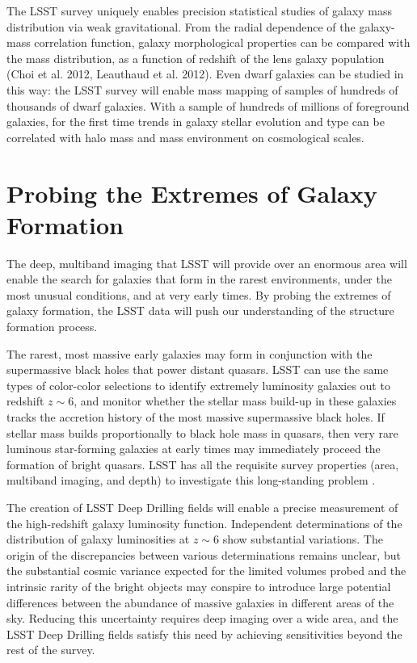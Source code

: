 {The LSST survey uniquely enables precision statistical studies of 
galaxy mass
distribution via weak gravitational.
From the radial dependence of
the galaxy-mass correlation function, galaxy morphological properties 
can be compared with the mass distribution, as a function
of redshift of the lens galaxy population (Choi et al. 2012,
Leauthaud et al. 2012).  Even dwarf galaxies 
can be studied in this way: the LSST survey will enable mass
mapping of samples of hundreds of thousands of dwarf galaxies.
With a sample of hundreds of millions of foreground galaxies, 
for the first time trends in galaxy stellar evolution and type 
can be correlated with halo mass and mass environment on cosmological scales.

\section{Probing the Extremes of Galaxy Formation}
\label{sec:sci:gal:bkgnd:rare}

The deep, multiband imaging that LSST will provide over an enormous
area will enable the search for galaxies that form in the
rarest environments, under the most unusual conditions,
and at very early times. By probing the extremes of
galaxy formation, the LSST data will push our 
understanding of the structure formation process.

The rarest, most massive early galaxies may form in 
conjunction with the supermassive black holes that
power distant quasars. LSST can use the same
types of color-color selections to identify extremely
luminosity galaxies out to redshift $z\sim6$, and
monitor whether the stellar mass build-up in these
galaxies tracks the accretion history of the most
massive supermassive black holes. If stellar mass
builds proportionally to black hole mass in quasars,
then very rare luminous star-forming galaxies at
early times may immediately proceed the formation
of bright quasars. LSST has all the requisite
survey properties (area, multiband imaging, and
depth) to investigate this long-standing problem \citep{robertson2007a}.

The creation of LSST Deep Drilling fields will
enable a precise measurement of the
high-redshift galaxy luminosity function.
Independent determinations of the distribution of 
galaxy luminosities at $z\sim6$ show substantial
variations. The origin of
the discrepancies between various determinations remains
unclear, but the substantial cosmic variance expected
for the limited volumes probed and the intrinsic
rarity of the bright objects may conspire to
introduce large potential differences between
the abundance of massive galaxies in different
areas of the sky. Reducing this uncertainty requires
deep imaging over a wide area, and the LSST Deep Drilling
fields satisfy this need by achieving sensitivities
beyond the rest of the survey. 

}
